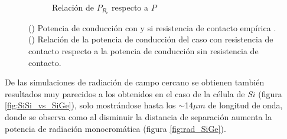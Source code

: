 \begin{figure}[H]
\begin{subfigure}[b]{0.49\textwidth}
		\caption{Relación de $P_{R_c}$ respecto a $P$}
		\label{fig:relPrc_SiSiO2Ge}
	\end{subfigure}
	\caption{() Potencia de conducción con y si resistencia de contacto empírica \cite{nf_TPV_Pillars_SiO2}. () Relación de la potencia de conducción del caso con resistencia de contacto respecto a la potencia de conducción sin resistencia de contacto.}
	\label{fig:Pcond_SiSiO2Ge}
\end{figure}
De las simulaciones de radiación de campo cercano se obtienen también resultados muy parecidos a los obtenidos en el caso de la célula de $Si$ (figura \ref{fig:SiSi_vs_SiGe}), solo mostrándose hasta los $\sim$14$\mu m$ de longitud de onda, donde se observa como al disminuir la distancia de separación aumenta la potencia de radiación monocromática (figura \ref{fig:rad_SiGe}).

